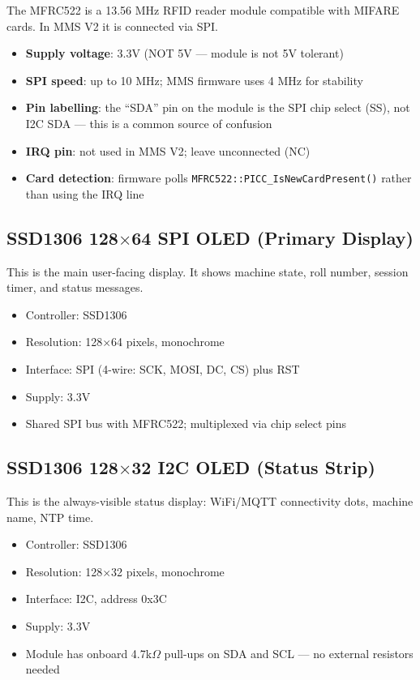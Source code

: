 The MFRC522 is a 13.56 MHz RFID reader module compatible with MIFARE cards. In MMS V2 it is connected via SPI.

\begin{itemize}[leftmargin=1.5em]
    \item \textbf{Supply voltage}: 3.3V (NOT 5V --- module is not 5V tolerant)
    \item \textbf{SPI speed}: up to 10 MHz; MMS firmware uses 4 MHz for stability
    \item \textbf{Pin labelling}: the ``SDA'' pin on the module is the SPI chip select (SS), not I2C SDA --- this is a common source of confusion
    \item \textbf{IRQ pin}: not used in MMS V2; leave unconnected (NC)
    \item \textbf{Card detection}: firmware polls \texttt{MFRC522::PICC\_IsNewCardPresent()} rather than using the IRQ line
\end{itemize}

\subsection{SSD1306 128$\times$64 SPI OLED (Primary Display)}

This is the main user-facing display. It shows machine state, roll number, session timer, and status messages.

\begin{itemize}[leftmargin=1.5em]
    \item Controller: SSD1306
    \item Resolution: 128$\times$64 pixels, monochrome
    \item Interface: SPI (4-wire: SCK, MOSI, DC, CS) plus RST
    \item Supply: 3.3V
    \item Shared SPI bus with MFRC522; multiplexed via chip select pins
\end{itemize}

\subsection{SSD1306 128$\times$32 I2C OLED (Status Strip)}

This is the always-visible status display: WiFi/MQTT connectivity dots, machine name, NTP time.

\begin{itemize}[leftmargin=1.5em]
    \item Controller: SSD1306
    \item Resolution: 128$\times$32 pixels, monochrome
    \item Interface: I2C, address 0x3C
    \item Supply: 3.3V
    \item Module has onboard 4.7k$\Omega$ pull-ups on SDA and SCL --- no external resistors needed
\end{itemize}

